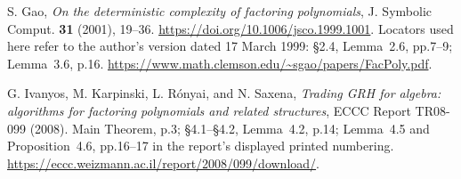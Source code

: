 S. Gao, \emph{On the deterministic complexity of factoring polynomials},
J. Symbolic Comput. \textbf{31} (2001), 19--36.
\url{https://doi.org/10.1006/jsco.1999.1001}.
Locators used here refer to the author's version dated
17 March 1999: \S2.4, Lemma~2.6, pp.7--9; Lemma~3.6, p.16.
\url{https://www.math.clemson.edu/~sgao/papers/FacPoly.pdf}.

G. Ivanyos, M. Karpinski, L. R\'onyai, and N. Saxena,
\emph{Trading GRH for algebra: algorithms for factoring polynomials
and related structures}, ECCC Report TR08-099 (2008).
Main Theorem, p.3; \S4.1--\S4.2,
Lemma~4.2, p.14; Lemma~4.5 and Proposition~4.6, pp.16--17
in the report's displayed printed numbering.
\url{https://eccc.weizmann.ac.il/report/2008/099/download/}.
